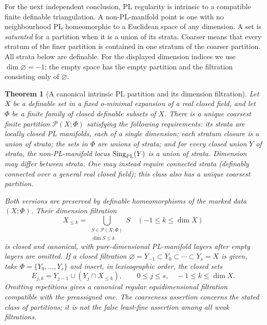 \documentclass[11pt,a4paper]{article}
\newtheorem{theorem}{Theorem}[section]
\theoremstyle{definition}
\begin{document}
For the next independent conclusion, PL regularity is intrinsic to a
compatible finite definable triangulation. A non-PL-manifold point is
one with no neighbourhood PL homeomorphic to a Euclidean space of any
dimension. A set is \emph{saturated} for a partition when it is a union
of its strata. Coarser means that every stratum of the finer partition
is contained in one stratum of the coarser partition.
All strata below are definable. For the displayed dimension indices
we use $\dim\varnothing=-1$; the empty space has the empty partition
and the filtration consisting only of $\varnothing$.
\begin{theorem}[A canonical intrinsic PL partition and its dimension filtration]\label{result-14}
Let $X$ be a definable set in a fixed o-minimal expansion
of a real closed field, and let $\Phi$ be a finite family of closed
definable subsets of $X$. There is a unique coarsest finite
partition $\mathcal P(X;\Phi)$ satisfying the following requirements:
its strata are locally closed PL manifolds, each of a single dimension;
each stratum closure is a union of strata; the sets in $\Phi$ are
unions of strata; and for every closed union $Y$ of strata, the
non-PL-manifold locus $\operatorname{Sing}_{\rm PL}(Y)$ is a union
of strata. Dimension may differ between strata. One may instead
require connected strata (definably connected over a general real
closed field); this class also has a unique coarsest
partition.

Both versions are preserved by definable homeomorphisms of the
marked data $(X;\Phi)$. Their dimension filtration
\[
 X_{\le k}=\bigcup_{\substack{S\in\mathcal P(X;\Phi)\\\dim S\le k}}S
 \quad(-1\le k\le\dim X)
\]
is closed and canonical, with pure-dimensional PL-manifold layers
after empty layers are omitted. If a closed filtration
$\varnothing=Y_{-1}\subset Y_0\subset\cdots\subset Y_s=X$ is
given, take $\Phi=\{Y_0,\ldots,Y_s\}$ and insert, in lexicographic
order, the closed sets
\[
 E_{j,k}=Y_{j-1}\cup(Y_j\cap X_{\le k}),
 \qquad 0\le j\le s,\quad -1\le k\le\dim X.
\]
Omitting repetitions gives a canonical regular equidimensional
filtration compatible with the preassigned one. The coarseness
assertion concerns the stated class of partitions; it is not the
false least-fine assertion among all weak filtrations.
\end{theorem}
\end{document}
